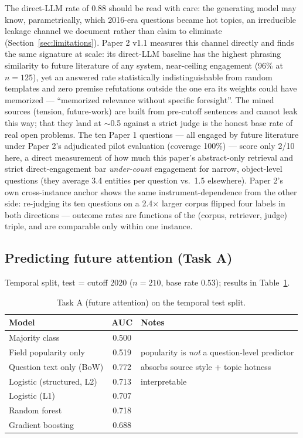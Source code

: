 \documentclass[11pt]{article}
\begin{document}
The direct-LLM rate of 0.88 should be read with care: the generating model
may know, parametrically, which 2016-era questions became hot topics, an
irreducible leakage channel we document rather than claim to eliminate
(Section~\ref{sec:limitations}). Paper 2 v1.1 measures this channel
directly and finds the same signature at scale: its direct-LLM baseline
has the highest phrasing similarity to future literature of any system,
near-ceiling engagement (96\% at $n=125$), yet an answered rate
statistically indistinguishable from random templates and zero premise
refutations outside the one era its weights could have memorized ---
``memorized relevance without specific foresight''. The mined sources
(tension, future-work) are built from pre-cutoff sentences and cannot
leak this way; that they land at $\sim$0.5 against a strict judge is
the honest base rate of real open problems. The ten Paper 1 questions
--- all engaged by future literature under Paper 2's adjudicated pilot
evaluation (coverage 100\%) --- score only 2/10 here, a direct
measurement of how much this paper's abstract-only retrieval and strict
direct-engagement bar \emph{under-count} engagement for narrow,
object-level questions (they average 3.4 entities per question vs.\ 1.5
elsewhere). Paper 2's own cross-instance anchor shows the same
instrument-dependence from the other side: re-judging its ten questions
on a 2.4$\times$ larger corpus flipped four labels in both directions
--- outcome rates are functions of the (corpus, retriever, judge)
triple, and are comparable only within one instance.

\subsection{Predicting future attention (Task A)}

Temporal split, test = cutoff 2020 ($n=210$, base rate 0.53); results in
Table~\ref{tab:models}.

\begin{table}[htbp]
  \centering
  \caption{Task A (future attention) on the temporal test split.}
  \label{tab:models}
  \begin{tabular}{lcl}
    \toprule
    Model & AUC & Notes \\
    \midrule
    Majority class            & 0.500 & \\
    Field popularity only     & 0.519 & popularity is \emph{not} a question-level predictor \\
    Question text only (BoW)  & 0.772 & absorbs source style + topic hotness \\
    Logistic (structured, L2) & 0.713 & interpretable \\
    Logistic (L1)             & 0.707 & \\
    Random forest             & 0.718 & \\
    Gradient boosting         & 0.688 & \\
    \bottomrule
  \end{tabular}
\end{table}
\end{document}
